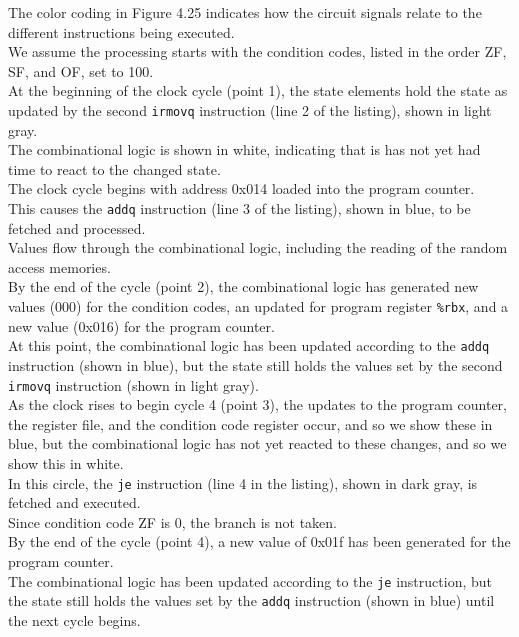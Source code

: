 \documentclass[11pt]{article}
\begin{document}
The color coding in Figure 4.25 indicates how the circuit signals relate to the different instructions being executed.\\
We assume the processing starts with the condition codes, listed in the order ZF, SF, and OF, set to 100.\\
At the beginning of the clock cycle (point 1), the state elements hold the state as updated by the second \texttt{irmovq} instruction (line 2 of the listing), shown in light gray.\\
The combinational logic is shown in white, indicating that is has not yet had time to react to the changed state.\\
The clock cycle begins with address 0x014 loaded into the program counter.\\
This causes the \texttt{addq} instruction (line 3 of the listing), shown in blue, to be fetched and processed.\\
Values flow through the combinational logic, including the reading of the random access memories.\\
By the end of the cycle (point 2), the combinational logic has generated new values (000) for the condition codes, an updated for program register \texttt{\%rbx}, and a new value (0x016) for the program counter.\\
At this point, the combinational logic has been updated according to the \texttt{addq} instruction (shown in blue), but the state still holds the values set by the second \texttt{irmovq} instruction (shown in light gray).\\


As the clock rises to begin cycle 4 (point 3), the updates to the program counter, the register file, and the condition code register occur, and so we show these in blue, but the combinational logic has not yet reacted to these changes, and so we show this in white.\\
In this circle, the \texttt{je} instruction (line 4 in the listing), shown in dark gray, is fetched and executed.\\
Since condition code ZF is 0, the branch is not taken.\\
By the end of the cycle (point 4), a new value of 0x01f has been generated for the program counter.\\
The combinational logic has been updated according to the \texttt{je} instruction, but the state still holds the values set by the \texttt{addq} instruction (shown in blue) until the next cycle begins.\\
\end{document}
